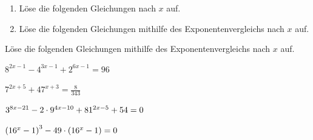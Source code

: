 \documentclass[11pt,oneside]{article}
\begin{document}
	\begin{aufgabe}
		\begin{enumerate}
			\item Löse die folgenden Gleichungen nach $x$ auf.
			\item Löse die folgenden Gleichungen mithilfe des Exponentenvergleichs nach $x$ auf.
		\end{enumerate}
	\end{aufgabe}
	\begin{aufgabe}
		Löse die folgenden Gleichungen mithilfe des Exponentenvergleichs nach $x$ auf.
		\begin{enumcols}[2]
			\item $8^{2x-1}-4^{3x-1}+2^{6x-1}=96$
			\item $7^{2x+5}+47^{x+3}=\frac{8}{343}$
			\item $3^{8x-21}-2\cdot9^{4x-10}+81^{2x-5}+54=0$
			\item $\left(16^x-1\right)^3-49\cdot\left(16^x-1\right)=0$
		\end{enumcols}
	\end{aufgabe}
\end{document}
